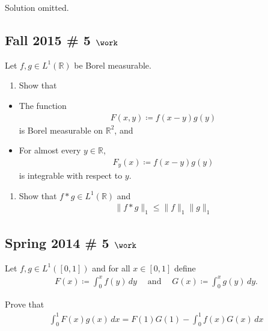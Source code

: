 Solution omitted.

\hypertarget{fall-2015-5-work}{%
\subsection{\texorpdfstring{Fall 2015 \# 5
\(\work\)}{Fall 2015 \# 5 \textbackslash work}}\label{fall-2015-5-work}}

Let \(f, g \in L^1({\mathbb{R}})\) be Borel measurable.

\begin{enumerate}
\def\labelenumi{\arabic{enumi}.}
\tightlist
\item
  Show that
\end{enumerate}

\begin{itemize}
\tightlist
\item
  The function
  \begin{align*}F(x, y) \coloneqq f(x-y) g(y)\end{align*}
  is Borel measurable on \({\mathbb{R}}^2\), and
\item
  For almost every \(y\in {\mathbb{R}}\),
  \begin{align*}F_y(x) \coloneqq f(x-y)g(y)\end{align*}
  is integrable with respect to \(y\).
\end{itemize}

\begin{enumerate}
\def\labelenumi{\arabic{enumi}.}
\setcounter{enumi}{1}
\tightlist
\item
  Show that \(f\ast g \in L^1({\mathbb{R}})\) and
  \begin{align*}
  \|f * g\|_{1} \leq \|f\|_{1} \|g\|_{1}
  \end{align*}
\end{enumerate}

\hypertarget{spring-2014-5-work}{%
\subsection{\texorpdfstring{Spring 2014 \# 5
\(\work\)}{Spring 2014 \# 5 \textbackslash work}}\label{spring-2014-5-work}}

Let \(f, g \in L^1([0, 1])\) and for all \(x\in [0, 1]\) define
\begin{align*}
F(x) \coloneqq\int _{0}^{x} f(y) \, dy 
{\quad \operatorname{and} \quad}
G(x)\coloneqq\int _{0}^{x} g(y) \, dy.
\end{align*}

Prove that
\begin{align*}
\int _{0}^{1} F(x) g(x) \, dx = 
F(1) G(1) - \int _{0}^{1} f(x) G(x) \, dx
\end{align*}

